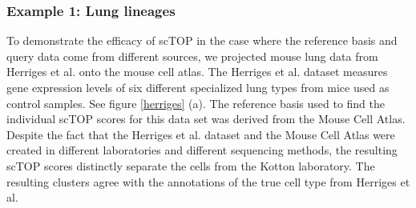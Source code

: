 \documentclass[aps,superscriptaddress, notitlepage,longbibliography]{revtex4-1}
\begin{document}
\subsubsection{Example 1: Lung lineages}
To demonstrate the efficacy of scTOP in the case where the reference basis and query data come from different sources, we projected mouse lung data from Herriges et al. \cite{herriges_durable_2022} onto the mouse cell atlas. The Herriges et al. dataset  measures gene expression levels of six different specialized lung types from mice used as control samples. See figure \ref{herriges} (a). The reference basis used to find the individual scTOP scores for this data set was derived from the Mouse Cell Atlas. Despite the fact that the Herriges et al. dataset and the Mouse Cell Atlas were created in different laboratories and different sequencing methods, the resulting scTOP scores distinctly separate the cells from the Kotton laboratory. The resulting clusters agree with the annotations of the true cell type from Herriges et al.
\end{document}
